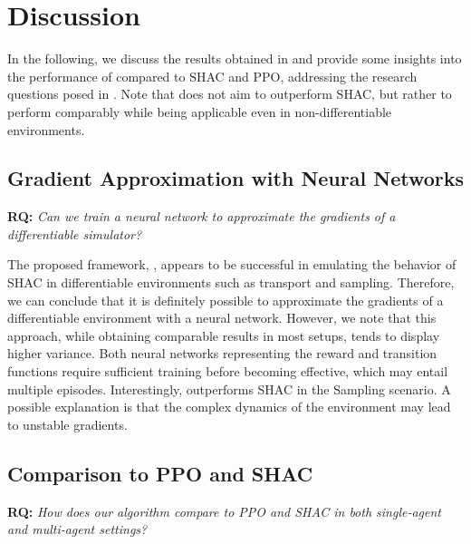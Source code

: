 \section{Discussion}
In the following, we discuss the results obtained in  and provide some insights into the performance of \fname{} compared to SHAC and PPO, addressing the research questions posed in . Note that \fname{} does not aim to outperform SHAC, but rather to perform comparably while being applicable even in non-differentiable environments.

\subsection{Gradient Approximation with Neural Networks}
\textbf{RQ:} \emph{Can we train a neural network to approximate the gradients of a differentiable simulator?}

The proposed framework, \fname{}, appears to be successful in emulating the behavior of SHAC in differentiable environments such as transport and sampling. Therefore, we can conclude that it is definitely possible to approximate the gradients of a differentiable environment with a neural network. However, we note that this approach, while obtaining comparable results in most setups, tends to display higher variance. Both neural networks representing the reward and transition functions require sufficient training before becoming effective, which may entail multiple episodes. Interestingly, \fname{} outperforms SHAC in the Sampling scenario. A possible explanation is that the complex dynamics of the environment may lead to unstable gradients.


\subsection{Comparison to PPO and SHAC}
\textbf{RQ:} \emph{How does our algorithm compare to PPO and SHAC in both single-agent and multi-agent settings?}

